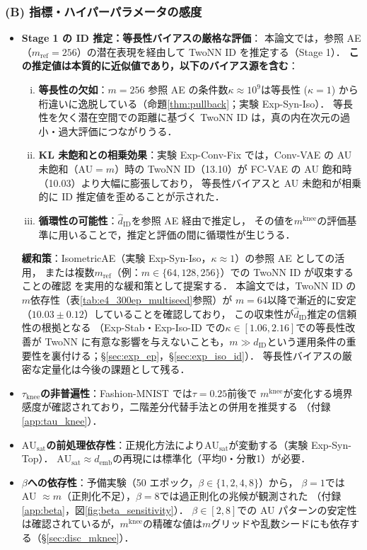 \documentclass[11pt,a4paper]{jsarticle}
\newcommand{\kap}{\kappa}
\newcommand{\AUsat}{\mathrm{AU}_{\mathrm{sat}}}
\newcommand{\mknee}{m^{\mathrm{knee}}}
\newcommand{\demb}{d_{\mathrm{emb}}}
\begin{document}
\subsubsection*{(B) 指標・ハイパーパラメータの感度}

\begin{itemize}
  \item \textbf{Stage 1 の ID 推定：等長性バイアスの厳格な評価}：
        本論文では，参照 AE（$m_\mathrm{ref}=256$）の潜在表現を経由して TwoNN ID を推定する（Stage 1）．
        \textbf{この推定値は本質的に近似値であり，以下のバイアス源を含む}：
        \begin{enumerate}[(i)]
          \item \textbf{等長性の欠如}：$m=256$ 参照 AE の条件数$\kap \approx 10^9$は等長性
                ($\kap=1$) から桁違いに逸脱している（命題\ref{thm:pullback}；実験 Exp-Syn-Iso）．
                等長性を欠く潜在空間での距離に基づく TwoNN ID は，真の内在次元の過小・過大評価につながりうる．
          \item \textbf{KL 未飽和との相乗効果}：実験 Exp-Conv-Fix では，Conv-VAE の AU 未飽和（AU$=m$）時の
                TwoNN ID（13.10）が FC-VAE の AU 飽和時（10.03）より大幅に膨張しており，
                等長性バイアスと AU 未飽和が相乗的に ID 推定値を歪めることが示された．
          \item \textbf{循環性の可能性}：$\hat{d}_\mathrm{ID}$を参照 AE 経由で推定し，
                その値を$\mknee$の評価基準に用いることで，推定と評価の間に循環性が生じうる．
        \end{enumerate}
        \textbf{緩和策}：IsometricAE（実験 Exp-Syn-Iso，$\kap \approx 1$）の参照 AE としての活用，
        または複数$m_\mathrm{ref}$（例：$m \in \{64, 128, 256\}$）での TwoNN ID が収束することの確認
        を実用的な緩和策として提案する．
        本論文では，TwoNN ID の$m$依存性（表\ref{tab:e4_300ep_multiseed}参照）が
        $m=64$以降で漸近的に安定（$10.03 \pm 0.12$）していることを確認しており，
        この収束性が$\hat{d}_\mathrm{ID}$推定の信頼性の根拠となる
        （Exp-Stab・Exp-Iso-ID での$\kap \in [1.06, 2.16]$での等長性改善が TwoNN に有意な影響を与えないことも，$m \gg d_\mathrm{ID}$という運用条件の重要性を裏付ける；§\ref{sec:exp_ep}，§\ref{sec:exp_iso_id}）．
        等長性バイアスの厳密な定量化は今後の課題として残る．
  \item \textbf{$\tau_{\mathrm{knee}}$の非普遍性}：Fashion-MNIST では$\tau = 0.25$前後で
        $\mknee$が変化する境界感度が確認されており，二階差分代替手法との併用を推奨する
        （付録\ref{app:tau_knee}）．
  \item \textbf{$\AUsat$の前処理依存性}：正規化方法により$\AUsat$が変動する（実験 Exp-Syn-Top）．
        $\AUsat \approx \demb$の再現には標準化（平均0・分散1）が必要．
  \item \textbf{$\beta$への依存性}：予備実験（50 エポック，$\beta \in \{1,2,4,8\}$）から，
        $\beta = 1$では AU $\approx m$（正則化不足），$\beta = 8$では過正則化の兆候が観測された
        （付録\ref{app:beta}，図\ref{fig:beta_sensitivity}）．
        $\beta \in [2, 8]$での AU パターンの安定性は確認されているが，$\mknee$の精確な値は$m$グリッドや乱数シードにも依存する（§\ref{sec:disc_mknee}）．
\end{itemize}
\end{document}
